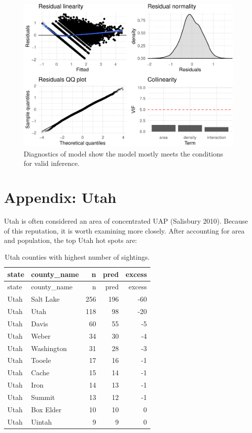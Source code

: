 \documentclass[]{elsarticle} %
\begin{document}
\begin{figure}

{\centering \includegraphics[width=1\linewidth]{lmm_paper_files/figure-latex/unnamed-chunk-11-1} 

}

\caption{Diagnostics of model show the model mostly meets the conditions for valid inference.}\label{fig:unnamed-chunk-11}
\end{figure}

\pagebreak

\hypertarget{appendix-utah}{%
\section{Appendix: Utah}\label{appendix-utah}}

Utah is often considered an area of concentrated UAP (Salisbury 2010).
Because of this reputation, it is worth examining more closely. After
accounting for area and population, the top Utah hot spots are:

\begin{longtable}[]{@{}llrrr@{}}
\caption{Utah counties with highest number of sightings.}\tabularnewline
\toprule
state & county\_name & n & pred & excess \\
\midrule
\endfirsthead
\toprule
state & county\_name & n & pred & excess \\
\midrule
\endhead
Utah & Salt Lake & 256 & 196 & -60 \\
Utah & Utah & 118 & 98 & -20 \\
Utah & Davis & 60 & 55 & -5 \\
Utah & Weber & 34 & 30 & -4 \\
Utah & Washington & 31 & 28 & -3 \\
Utah & Tooele & 17 & 16 & -1 \\
Utah & Cache & 15 & 14 & -1 \\
Utah & Iron & 14 & 13 & -1 \\
Utah & Summit & 13 & 12 & -1 \\
Utah & Box Elder & 10 & 10 & 0 \\
Utah & Uintah & 9 & 9 & 0 \\
\bottomrule
\end{longtable}
\end{document}
